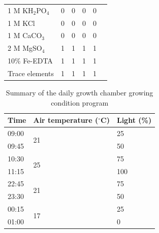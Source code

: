 \begin{table}[!h]
{\begin{tabular}{p{4cm}p{2cm}p{2cm}p{2cm}p{2cm}p{2cm}}
        1 M KH$_2$PO$_4$        & \multicolumn{1}{r}{0}         & \multicolumn{1}{r}{0}         & \multicolumn{1}{r}{0}         & \multicolumn{1}{r}{0}         &   \\
        1 M KCl                 & \multicolumn{1}{r}{0}         & \multicolumn{1}{r}{0}         & \multicolumn{1}{r}{0}         & \multicolumn{1}{r}{0}         &   \\
        1 M CaCO$_3$            & \multicolumn{1}{r}{0}         & \multicolumn{1}{r}{0}         & \multicolumn{1}{r}{0}         & \multicolumn{1}{r}{0}         &   \\
        2 M MgSO$_4$            & \multicolumn{1}{r}{1}         & \multicolumn{1}{r}{1}         & \multicolumn{1}{r}{1}         & \multicolumn{1}{r}{1}         &   \\
        10\% Fe-EDTA            & \multicolumn{1}{r}{1}         & \multicolumn{1}{r}{1}         & \multicolumn{1}{r}{1}         & \multicolumn{1}{r}{1}         &   \\
        Trace elements          & \multicolumn{1}{r}{1}         & \multicolumn{1}{r}{1}         & \multicolumn{1}{r}{1}         & \multicolumn{1}{r}{1}         &   \\
        \hline
\end{tabular}}
\end{table}
\clearpage

\newpage
\begin{table}[]
    \centering
    \caption{Summary of the daily growth chamber growing condition program}
    \label{table:tab.d2}
    \begin{tabular}{|p{2cm}|p{4.5cm}|p{2cm}|}
        \hline
        Time  & Air temperature ($^{\circ}$C)   & Light (\%) \\
        \hline
        09:00 & \multirow{2}{*}{21}             & 25         \\
        09:45 &                                 & 50         \\
        \hline
        10:30 & \multirow{2}{*}{25}             & 75         \\
        11:15 &                                 & 100        \\
        \hline
        22:45 & \multirow{2}{*}{21}             & 75         \\
        23:30 &                                 & 50         \\
        \hline
        00:15 & \multirow{2}{*}{17}             & 25         \\
        01:00 &                                 & 0          \\
        \hline      
    \end{tabular}%
\end{table}
\clearpage

